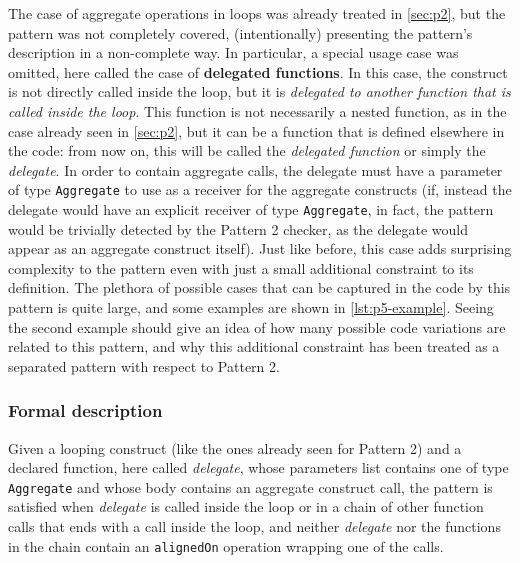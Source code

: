 \documentclass[12pt,a4paper,openright,twoside]{book}
\begin{document}
The case of aggregate operations in loops was already treated in \cref{sec:p2},
but the pattern was not completely covered, (intentionally) presenting the
pattern's description in a non-complete way. In particular, a special usage
case was omitted, here called the case of \textbf{delegated functions}. 
%
In this case, the construct is not directly called inside the loop, but it is
\emph{delegated to another function that is called inside the loop}. This
function is not necessarily a nested function, as in the case already seen in
\cref{sec:p2}, but it can be a function that is defined elsewhere in the code:
from now on, this will be called the \emph{delegated function} or simply the
\emph{delegate}. In order to contain aggregate calls, the delegate must have a
parameter of type \lstinline{Aggregate} to use as a receiver for the aggregate
constructs (if, instead the delegate would have an explicit receiver of type
\lstinline{Aggregate}, in fact, the pattern would be trivially detected by the
Pattern 2 checker, as the delegate would appear as an aggregate construct
itself).
%
Just like before, this case adds surprising complexity to the pattern even with
just a small additional constraint to its definition. The plethora of possible
cases that can be captured in the code by this pattern is quite large, and some
examples are shown in \cref{lst:p5-example}. Seeing the second example should
give an idea of how many possible code variations are related to this pattern,
and why this additional constraint has been treated as a separated pattern with
respect to Pattern 2.



\subsubsection{Formal description}

Given a looping construct (like the ones already seen for Pattern 2) and a
declared function, here called \emph{delegate}, whose parameters list contains
one of type \lstinline{Aggregate} and whose body contains an aggregate construct
call, the pattern is satisfied when \emph{delegate} is called inside the loop or
in a chain of other function calls that ends with a call inside the loop, and
neither \emph{delegate} nor the functions in the chain contain an
\lstinline{alignedOn} operation wrapping one of the calls.
\end{document}
